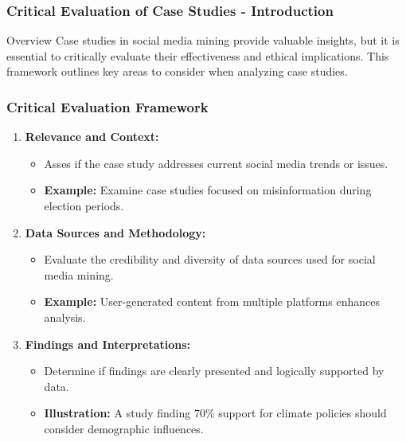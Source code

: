 \documentclass{beamer}
\begin{document}
\begin{frame}[fragile]
    \frametitle{Critical Evaluation of Case Studies - Introduction}
    \begin{block}{Overview}
        Case studies in social media mining provide valuable insights, but it is essential to critically evaluate their effectiveness and ethical implications. 
        This framework outlines key areas to consider when analyzing case studies.
    \end{block}
\end{frame}

\begin{frame}[fragile]
    \frametitle{Critical Evaluation Framework}
    \begin{enumerate}
        \item \textbf{Relevance and Context:}
            \begin{itemize}
                \item Asses if the case study addresses current social media trends or issues. 
                \item \textbf{Example:} Examine case studies focused on misinformation during election periods.
            \end{itemize}
        \item \textbf{Data Sources and Methodology:}
            \begin{itemize}
                \item Evaluate the credibility and diversity of data sources used for social media mining. 
                \item \textbf{Example:} User-generated content from multiple platforms enhances analysis.
            \end{itemize}
        \item \textbf{Findings and Interpretations:}
            \begin{itemize}
                \item Determine if findings are clearly presented and logically supported by data.
                \item \textbf{Illustration:} A study finding 70\% support for climate policies should consider demographic influences.
            \end{itemize}
    \end{enumerate}
\end{frame}
\end{document}
